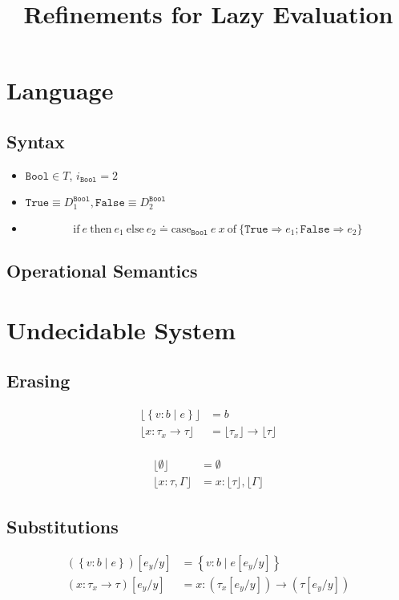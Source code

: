 \documentclass[10pt,a4paper]{article}
\title{Refinements for Lazy Evaluation}
\newcommand\tref[3]{\ensuremath{\left\lbrace {#1} \colon {#2} \mid {#3} \right\rbrace}}
\newcommand\tconref[4]{\tref{#3}{\tcon{#1}{#2}}{#4}}
\newcommand\tcon[2]{\ensuremath{#1\ #2}}
\newcommand\tfun[3]{\ensuremath{#1\colon #2 \rightarrow #3}}
\newcommand\tfunref[5]{\tfun{#1}{#2}{#3}}
\newcommand\sub[2]{\ensuremath{\left[ #2 / #1 \right]}}
\newcommand\erase[1]{\ensuremath{\lfloor #1 \rfloor}}
\begin{document}
\section{Language}
\subsection{Syntax}

\begin{itemize}
\item $\texttt{Bool}\in T$, $i_\texttt{Bool} = 2$
\item $\texttt{True}  \equiv D^{\texttt{Bool}}_1, \texttt{False} \equiv D^{\texttt{Bool}}_2$
\item
$$\text{if}\ e\ \text{then}\ e_1\ \text{else}\ e_2 \doteq 
\text{case}_{\texttt{Bool}}\ e\ x\ \text{of}\ \{\texttt{True}\Rightarrow e_1;\texttt{False}\Rightarrow e_2 \}
$$
\end{itemize}
\subsection{Operational Semantics}


\section{Undecidable System}
\subsection{Erasing}
\begin{align*}
\erase{\tref{v}{b}{e}}&=b\\
\erase{\tfunref{x}{\tau_x}{\tau}{v}{e}}&= \erase{\tau_x} \rightarrow \erase{\tau}\\
\end{align*}

\begin{align*}
\erase{\emptyset}&=\emptyset\\
\erase{x\colon\tau, \Gamma}&= x\colon\erase{\tau},\erase{\Gamma}
\end{align*}

\subsection{Substitutions}
\begin{align*}
(\tref{v}{b}{e})\sub{y}{e_y} &=\tref{v}{b}{e\sub{y}{e_y}}\\
(\tfunref{x}{\tau_x}{\tau}{v}{e})\sub{y}{e_y} &=
	\tfunref{x}{(\tau_x\sub{y}{e_y})}{(\tau\sub{y}{e_y})}{v}{e\sub{y}{e_y}}\\
\end{align*}
\end{document}
